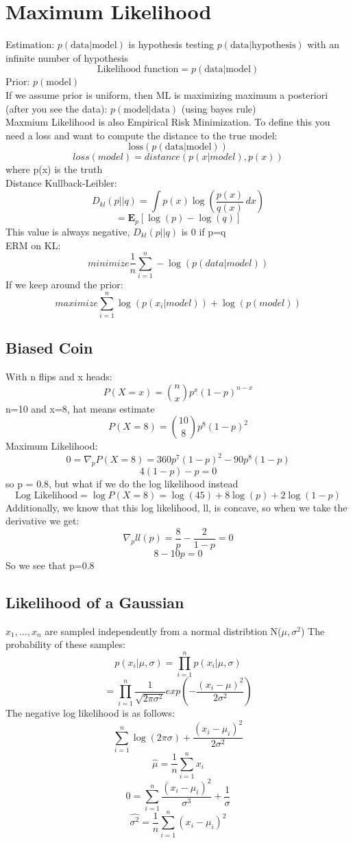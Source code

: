 \documentclass{article}
\begin{document}
\section{Maximum Likelihood}
Estimation: $p(\textrm{data}|\textrm{model})$ is hypothesis testing $p(\textrm{data}|\textrm{hypothesis})$ with an infinite number of hypothesis\\
$$\textrm{Likelihood function}  = p(\textrm{data}|\textrm{model})$$
Prior: $p(\textrm{model})$\\
If we assume prior is uniform, then ML is maximizing maximum a posteriori (after you see the data): $p(\textrm{model}|\textrm{data})$ (using bayes rule) \\
Maxmium Likelihood is also Empirical Risk Minimization. To define this you need a loss and want to compute the distance to the true model:
$$\textrm{loss}(p(\textrm{data}|\textrm{model}))$$
$$loss(model) = distance(p(x|model),p(x))$$ where p(x) is the truth \\ 
Distance Kullback-Leibler:
$$D_{kl}(p||q) = \int p(x) \log(\frac{p(x)}{q(x)} \, dx)$$
$$= \mathbf{E}_p[\log(p) - \log(q)]$$
This value is always negative, $D_{kl}(p||q)$ is 0 if p=q \\
ERM on KL:
$$minimize \frac{1}{n} \sum_{i=1}^n -\log(p(data|model))$$
If we keep around the prior:
$$maximize \sum_{i=1}^n \log(p(x_i|model)) + \log(p(model))$$
\subsection{Biased Coin}
With n flips and x heads:
$$P(X=x) = \binom{n}{x}p^x (1-p)^{n-x}$$
n=10 and x=8, hat means estimate
$$P(X=8) = \binom{10}{8}p^8 (1-p)^{2}$$
Maximum Likelihood:
$$0 = \nabla_p P(X=8) = 360p^7(1-p)^2 - 90p^8(1-p)$$
$$4(1-p) - p = 0$$ so p = 0.8, but what if we do the log likelihood instead
$$\textrm{Log Likelihood} = \log P(X=8) = \log(45) + 8\log(p) + 2\log(1-p)$$
Additionally, we know that this log likelihood, ll, is concave, so when we take the derivative we get:
$$\nabla_p ll(p) = \frac{8}{p} - \frac{2}{1-p} = 0$$
$$8 - 10p = 0$$
So we see that p=0.8

\subsection{Likelihood of a Gaussian}
$x_1,...,x_n$ are sampled independently from a normal distribtion N($\mu, \sigma^2$)
The probability of these samples:
$$p({x_i}|\mu, \sigma) = \prod_{i=1}^n p(x_i|\mu, \sigma)$$
$$= \prod_{i=1}^n \frac{1}{\sqrt{2\pi \sigma^2}} exp(-\frac{(x_i - \mu)^2}{2\sigma^2})$$
The negative log likelihood is as follows:
$$\sum_{i=1}^n \log(2\pi \sigma) + \frac{(x_i - \mu_i)^2}{2 \sigma^2}$$
$$\hat{\mu} = \frac{1}{n} \sum_{i=1}^n x_i$$
$$0 = \sum_{i=1}^n \frac{(x_i - \mu_i)^2}{\sigma^3} + \frac{1}{\sigma}$$
$$\hat{\sigma^2} = \frac{1}{n} \sum_{i=1}^n (x_i - \mu_i)^2$$
\end{document}
